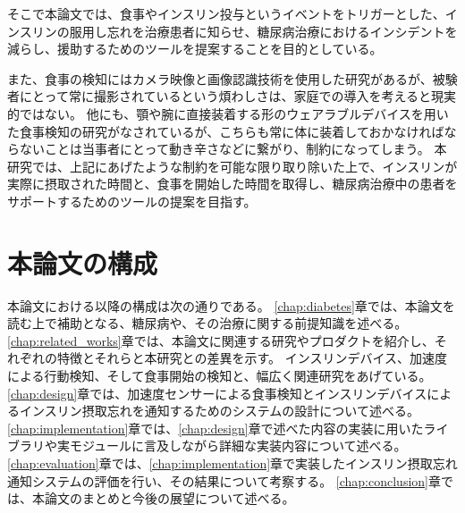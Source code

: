 そこで本論文では、食事やインスリン投与というイベントをトリガーとした、インスリンの服用し忘れを治療患者に知らせ、糖尿病治療におけるインシデントを減らし、援助するためのツールを提案することを目的としている。

また、食事の検知にはカメラ映像と画像認識技術を使用した研究があるが、被験者にとって常に撮影されているという煩わしさは、家庭での導入を考えると現実的ではない。
他にも、顎や腕に直接装着する形のウェアラブルデバイスを用いた食事検知の研究がなされているが、こちらも常に体に装着しておかなければならないことは当事者にとって動き辛さなどに繋がり、制約になってしまう。
本研究では、上記にあげたような制約を可能な限り取り除いた上で、インスリンが実際に摂取された時間と、食事を開始した時間を取得し、糖尿病治療中の患者をサポートするためのツールの提案を目指す。

\section{本論文の構成}
\label{section:structure}
本論文における以降の構成は次の通りである。
\ref{chap:diabetes}章では、本論文を読む上で補助となる、糖尿病や、その治療に関する前提知識を述べる。
\ref{chap:related_works}章では、本論文に関連する研究やプロダクトを紹介し、それぞれの特徴とそれらと本研究との差異を示す。
インスリンデバイス、加速度による行動検知、そして食事開始の検知と、幅広く関連研究をあげている。
\ref{chap:design}章では、加速度センサーによる食事検知とインスリンデバイスによるインスリン摂取忘れを通知するためのシステムの設計について述べる。
\ref{chap:implementation}章では、\ref{chap:design}章で述べた内容の実装に用いたライブラリや実モジュールに言及しながら詳細な実装内容について述べる。
\ref{chap:evaluation}章では、\ref{chap:implementation}章で実装したインスリン摂取忘れ通知システムの評価を行い、その結果について考察する。
\ref{chap:conclusion}章では、本論文のまとめと今後の展望について述べる。
